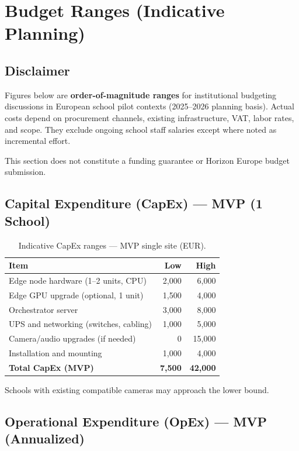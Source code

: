 \section{Budget Ranges (Indicative Planning)}
\label{sec:budget-ranges}

\subsection{Disclaimer}

Figures below are \textbf{order-of-magnitude ranges} for institutional budgeting discussions
in European school pilot contexts (2025--2026 planning basis).
Actual costs depend on procurement channels, existing infrastructure, VAT, labor rates, and
scope.
They exclude ongoing school staff salaries except where noted as incremental effort.

This section does not constitute a funding guarantee or Horizon Europe budget submission.

\subsection{Capital Expenditure (CapEx) --- MVP (1 School)}

\begin{table}[htbp]
  \centering
  \caption{Indicative CapEx ranges --- MVP single site (EUR).}
  \label{tab:capex-mvp}
  \small
  \begin{tabular}{@{}lrr@{}}
    \toprule
    Item & Low & High \\
    \midrule
    Edge node hardware (1--2 units, CPU) & 2{,}000 & 6{,}000 \\
    Edge GPU upgrade (optional, 1 unit) & 1{,}500 & 4{,}000 \\
    Orchestrator server & 3{,}000 & 8{,}000 \\
    UPS and networking (switches, cabling) & 1{,}000 & 5{,}000 \\
    Camera/audio upgrades (if needed) & 0 & 15{,}000 \\
    Installation and mounting & 1{,}000 & 4{,}000 \\
    \midrule
    \textbf{Total CapEx (MVP)} & \textbf{7{,}500} & \textbf{42{,}000} \\
    \bottomrule
  \end{tabular}
\end{table}

Schools with existing compatible cameras may approach the lower bound.

\subsection{Operational Expenditure (OpEx) --- MVP (Annualized)}


